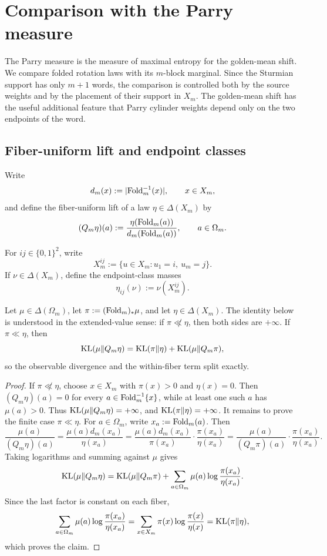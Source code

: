 \section{Comparison with the Parry measure}

The Parry measure is the measure of maximal entropy for the golden-mean shift.
We compare folded rotation laws with its \(m\)-block marginal.  Since the
Sturmian support has only \(m+1\) words, the comparison is controlled both by
the source weights and by the placement of their support in \(X_m\).  The
golden-mean shift has the useful additional feature that Parry cylinder weights
depend only on the two endpoints of the word.

\subsection{Fiber-uniform lift and endpoint classes}

Write
\[
d_m(x):=|\mathrm{Fold}_m^{-1}(x)|,\qquad x\in X_m,
\]
and define the fiber-uniform lift of a law \(\eta\in\Delta(X_m)\) by
\[
(Q_m\eta)(a):=\frac{\eta(\mathrm{Fold}_m(a))}{d_m(\mathrm{Fold}_m(a))},
\qquad a\in\Omega_m.
\]

For \(ij\in\{0,1\}^2\), write
\[
X_m^{ij}:=\{u\in X_m:u_1=i,\ u_m=j\}.
\]
If \(\nu\in\Delta(X_m)\), define the endpoint-class masses
\[
\eta_{ij}(\nu):=\nu(X_m^{ij}).
\]

\begin{proposition}
\label{prop:fiber-uniform-lift-decomposition}
Let \(\mu\in\Delta(\Omega_m)\), let \(\pi:=(\mathrm{Fold}_m)_*\mu\), and let
\(\eta\in\Delta(X_m)\). The identity below is understood in the
extended-value sense: if \(\pi\not\ll\eta\), then both sides are \(+\infty\).
If \(\pi\ll\eta\), then
\[
\operatorname{KL}(\mu\|Q_m\eta)=\operatorname{KL}(\pi\|\eta)+\operatorname{KL}(\mu\|Q_m\pi),
\]
so the observable divergence and the within-fiber term split exactly.
\end{proposition}

\begin{proof}
If \(\pi\not\ll\eta\), choose \(x\in X_m\) with \(\pi(x)>0\) and
\(\eta(x)=0\).  Then \((Q_m\eta)(a)=0\) for every
\(a\in\mathrm{Fold}_m^{-1}\{x\}\), while at least one such \(a\) has \(\mu(a)>0\).
Thus \(\operatorname{KL}(\mu\|Q_m\eta)=+\infty\), and \(\operatorname{KL}(\pi\|\eta)=+\infty\).
It remains to prove the finite case \(\pi\ll\eta\).
For \(a\in\Omega_m\), write \(x_a:=\mathrm{Fold}_m(a)\). Then
\[
\frac{\mu(a)}{(Q_m\eta)(a)}
=
\frac{\mu(a)d_m(x_a)}{\eta(x_a)}
=
\frac{\mu(a)d_m(x_a)}{\pi(x_a)}
\cdot
\frac{\pi(x_a)}{\eta(x_a)}
=
\frac{\mu(a)}{(Q_m\pi)(a)}
\cdot
\frac{\pi(x_a)}{\eta(x_a)}.
\]
Taking logarithms and summing against \(\mu\) gives
\[
\operatorname{KL}(\mu\|Q_m\eta)
=
\operatorname{KL}(\mu\|Q_m\pi)
+
\sum_{a\in\Omega_m}\mu(a)\log\frac{\pi(x_a)}{\eta(x_a)}.
\]
Since the last factor is constant on each fiber,
\[
\sum_{a\in\Omega_m}\mu(a)\log\frac{\pi(x_a)}{\eta(x_a)}
=
\sum_{x\in X_m}\pi(x)\log\frac{\pi(x)}{\eta(x)}
=
\operatorname{KL}(\pi\|\eta),
\]
which proves the claim.
\end{proof}

